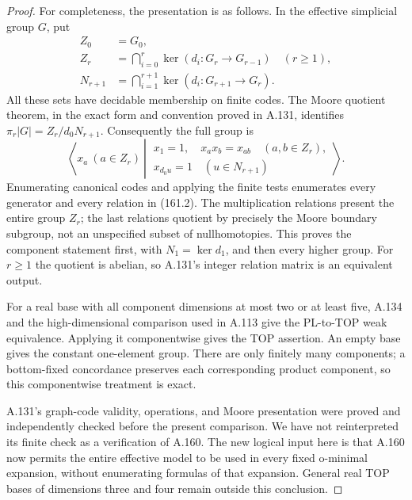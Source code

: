 \begin{proof}
For completeness, the presentation is as follows. In the effective
simplicial group \(G\), put
\[
 \begin{aligned}
 Z_0&=G_0,\\
 Z_r&=\bigcap_{i=0}^{r}\ker(d_i:G_r\to G_{r-1})\quad(r\geq1),\\
 N_{r+1}&=\bigcap_{i=1}^{r+1}\ker(d_i:G_{r+1}\to G_r).
 \end{aligned}
\]
All these sets have decidable membership on finite codes. The Moore
quotient theorem, in the exact form and convention proved in A.131,
identifies \(\pi_r|G|=Z_r/d_0N_{r+1}\). Consequently the full group is
\[
 \left\langle x_a\ (a\in Z_r)\ \left|\
 \begin{array}{l}
 x_1=1,\quad x_ax_b=x_{ab}\quad(a,b\in Z_r),\\
 x_{d_0u}=1\quad(u\in N_{r+1})
 \end{array}\right.\right\rangle .
 \tag{161.2}
\]
Enumerating canonical codes and applying the finite tests enumerates
every generator and every relation in (161.2). The multiplication
relations present the entire group \(Z_r\); the last relations
quotient by precisely the Moore boundary subgroup, not an unspecified
subset of nullhomotopies. This proves the component statement first,
with \(N_1=\ker d_1\), and then every higher group. For \(r\geq1\)
the quotient is abelian, so A.131's integer relation matrix is an
equivalent output.

For a real base with all component dimensions at most two or at least
five, A.134 and the high-dimensional comparison used in A.113 give
the PL-to-TOP weak equivalence. Applying it componentwise gives the
TOP assertion. An empty base gives the constant one-element group.
There are only finitely many components; a bottom-fixed concordance
preserves each corresponding product component, so this
componentwise treatment is exact.

A.131's graph-code validity, operations, and Moore presentation were
proved and independently checked before the present comparison.
We have not reinterpreted its finite check as a verification of
A.160. The new logical input here is that A.160 now permits the
entire effective model to be used in every fixed o-minimal expansion,
without enumerating formulas of that expansion. General real TOP
bases of dimensions three and four remain outside this conclusion.
\end{proof}

